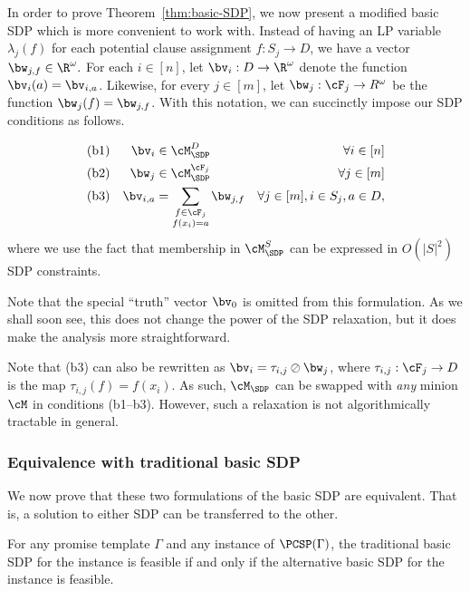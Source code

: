 {In order to prove Theorem~\ref{thm:basic-SDP}, w}e now present a modified basic SDP which is more convenient to work with. {Instead of having an LP variable $\lambda_j(f)$ for each potential clause assignment $f : S_j \to D$, we have a vector $\bw_{j,f} \in \R^{\omega}.$ For each $i \in [n]$, let $\bv_i : D \to \R^{\omega}$ denote the function $\bv_i(a) = \bv_{i,a}$. Likewise, for every $j \in [m]$, let $\bw_j : \cF_j \to R^{\omega}$ be the function $\bw_j(f) = \bw_{j,f}$. With this notation, we can succinctly impose our SDP conditions as follows.}

{
\begin{align*}
\text{(b1)} &&  \bv_i &\in \cM_{\SDP}^{D} & \forall i \in [n] \\ 
\text{(b2)} && \bw_j &\in \cM_{\SDP}^{\cF_j}   & \forall j \in [m] \\ 
\text{(b3)} && \bv_{i,a} &= \sum_{\substack{f \in \cF_j\\f(x_i) = a}} \bw_{j,f} & \forall j \in [m], i \in S_j, a \in D,
\end{align*}
}
where we use the fact that membership in $\cM_{\SDP}^S$ can be expressed in $O(|S|^2)$ SDP constraints.

\begin{remark}
{Note that the special ``truth'' vector $\bv_0$ is omitted from this formulation. As we shall soon see, this does not change the power of the SDP relaxation, but it does make the analysis more straightforward.}
\end{remark}

{
\begin{remark}\label{rem:b3}
Note that (b3) can also be rewritten as $\bv_i = \tau_{i,j} \oslash \bw_j$, where $\tau_{i,j} : \cF_j \to D$ is the map $\tau_{i,j}(f) = f(x_i)$. As such, $\cM_{\SDP}$ can be swapped with \emph{any} minion $\cM$ in conditions (b1--b3). However, such a relaxation is not algorithmically tractable in general.
\end{remark}
}

\subsubsection{Equivalence with traditional basic SDP}

We now prove that these two formulations of the basic SDP are equivalent. 
That is, a solution to either SDP can be transferred to the other. 

{\begin{lemma}\label{lem:SDP-equiv}
For any promise template $\Gamma$ and any instance of $\PCSP(\Gamma)$, the traditional basic SDP for the instance is feasible if and only if the alternative basic SDP for the instance is feasible.
\end{lemma}}

